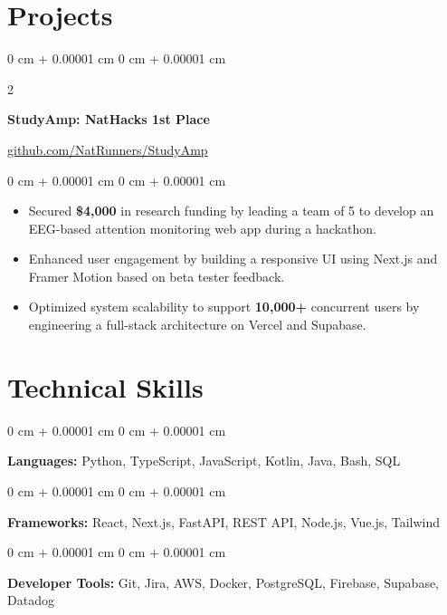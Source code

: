 \documentclass[10pt, letterpaper]{article}
\newenvironment{onecolentry}{
    \begin{adjustwidth}{
        0 cm + 0.00001 cm
    }{
        0 cm + 0.00001 cm
    }
}{
    \end{adjustwidth}
}
\newenvironment{twocolentry}[2][]{
    \onecolentry
    \def\secondColumn{#2}
    \setcolumnwidth{\fill, 6 cm}
    \begin{paracol}{2}
}{
    \switchcolumn \raggedleft \secondColumn
    \end{paracol}
    \endonecolentry
}
\begin{document}
    \vspace{0.10 cm}
    \section{Projects}

    \begin{twocolentry}{\href{https://github.com/NatRunners/StudyAmp}{github.com/NatRunners/StudyAmp}}
        \textbf{StudyAmp: NatHacks 1st Place}
    \end{twocolentry}

    \vspace{0.10 cm}
    \begin{onecolentry}
        \begin{itemize}[leftmargin=2em, itemsep=1pt, parsep=0pt, topsep=0pt, partopsep=0pt]
            \item Secured \textbf{\$4,000} in research funding by leading a team of 5 to develop an EEG-based attention monitoring web app during a hackathon.
            \item Enhanced user engagement by building a responsive UI using Next.js and Framer Motion based on beta tester feedback.
            \item Optimized system scalability to support \textbf{10,000+} concurrent users by engineering a full-stack architecture on Vercel and Supabase.
        \end{itemize}
    \end{onecolentry}

    \vspace{0.10 cm}
    \section{Technical Skills}

    \begin{onecolentry}
        \textbf{Languages:} Python, TypeScript, JavaScript, Kotlin, Java, Bash, SQL
    \end{onecolentry}

    \vspace{0.1 cm}

    \begin{onecolentry}
        \textbf{Frameworks:} React, Next.js, FastAPI, REST API, Node.js, Vue.js, Tailwind
    \end{onecolentry}

    \vspace{0.1 cm}

    \begin{onecolentry}
        \textbf{Developer Tools:} Git, Jira, AWS, Docker, PostgreSQL, Firebase, Supabase, Datadog
    \end{onecolentry}
\end{document}
